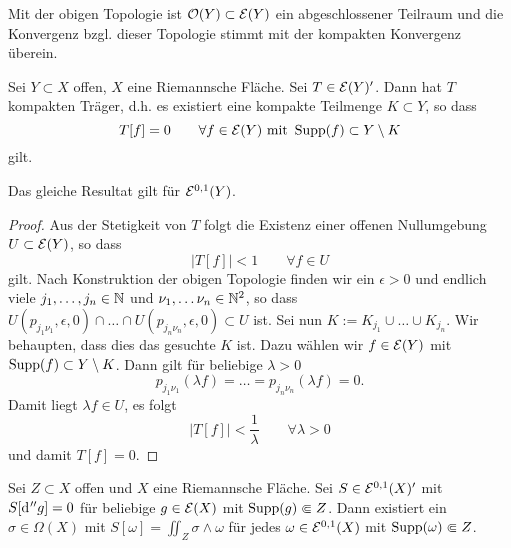 \begin{cor}
  Mit der obigen Topologie ist $\mathcal{O}(Y) \subset \mathcal{E}(Y)$ ein
  abgeschlossener Teilraum und die Konvergenz bzgl. dieser Topologie
  stimmt mit der kompakten Konvergenz überein.
\end{cor}

\begin{lemma}
  \label{lemma:kompakter-träger-funktional}
  Sei $Y \subset X$ offen, $X$ eine Riemannsche Fläche. Sei $T \in
  \mathcal{E}(Y)'$. 
  Dann hat $T$ kompakten Träger, d.h. es existiert eine kompakte
  Teilmenge $K \subset Y$, so dass
  \[
  T[f] = 0 \qquad \forall f \in \mathcal{E}(Y) \text{ mit } \operatorname{Supp}(f) \subset
  Y \setminus K
  \]
  gilt.
  
  Das gleiche Resultat gilt für $\mathcal{E}^{0,1}(Y)$.
\end{lemma}

\begin{proof}
  Aus der Stetigkeit von $T$ folgt die Existenz einer offenen
  Nullumgebung $U \subset \mathcal{E}(Y)$, so dass
  \[
  |T[f]| < 1 \qquad \forall f \in U
  \]
  gilt. Nach Konstruktion der obigen Topologie finden wir ein $\epsilon > 0$
  und endlich viele $j_1, \dots, j_n \in \mathbb{N}$ und $\nu_1, \dots \nu_n
  \in \mathbb{N}^2$, so dass $U(p_{j_1\nu_1}, \epsilon, 0) \cap \dots \cap
  U(p_{j_n\nu_n}, \epsilon, 0) \subset U$ ist.
  Sei nun  $K := K_{j_1} \cup \dots \cup K_{j_n}$. Wir behaupten, dass
  dies das gesuchte $K$ ist. 
  Dazu wählen wir $f \in \mathcal{E}(Y)$ mit $\operatorname{Supp}(f) \subset Y \setminus
  K$. Dann gilt für beliebige
  $\lambda > 0$
  \[
  p_{j_1\nu_1}(\lambda f) = \dots = p_{j_n\nu_n}(\lambda f) = 0.
  \]
  Damit liegt $\lambda f \in U$, es folgt
  \[
  |T[f]| < \frac1\lambda \qquad \forall \lambda >0
  \]
  und damit $T[f] = 0$.
\end{proof}

\begin{lemma}
  \label{lemma:funktional-explizit}
  Sei $Z \subset X$ offen und $X$ eine Riemannsche Fläche. Sei $S \in
  \mathcal{E}^{0,1}(X)'$ mit $S[\d[''g]] = 0$ für beliebige $g \in \mathcal{E}(X)$
  mit $\operatorname{Supp}(g) \Subset Z$. 
  Dann existiert ein $\sigma \in \Omega(X)$ mit $S[\omega] = \iint_Z
  \sigma \wedge \omega$ für jedes $\omega \in \mathcal{E}^{0,1}(X)$ mit
  $\operatorname{Supp}(\omega) \Subset Z$.
\end{lemma}

